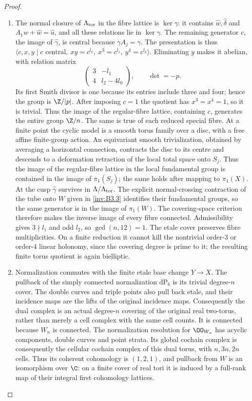 \begin{proof}
\begin{enumerate}[label={$\langle1\rangle$\arabic*.},leftmargin=*]
\item The normal closure of $\Lambda_{\rm tor}$ in the fibre lattice is
$\ker\gamma$: it contains $\hat w,\hat\delta$ and
$A_1\hat w+\hat w=\hat u$, and all these relations lie in
$\ker\gamma$. The remaining generator $c$, the image of
$\hat\gamma$, is central because $\gamma A_j=\gamma$.
The presentation is thus
$\langle c,x,y\mid c\text{ central},\ xy=c^{l_0},\
x^3=c^{l_1},\ y^4=c^{l_2}\rangle$.
Eliminating $y$ makes it abelian, with relation matrix
\[
 \begin{pmatrix}3&-l_1\\4&l_2-4l_0\end{pmatrix},
 \qquad\det=-p.
\]
Its first Smith divisor is one because its entries include three
and four; hence the group is $\Z/|p|$.
After imposing $c=1$ the quotient has $x^3=x^4=1$, so it is trivial.
Thus the image of the regular-fibre lattice, containing $c$, generates
the entire group $\Z/n$. The same is true of each reduced special
fibre. At a finite point the cyclic model is a smooth torus family
over a disc, with a free affine finite-group action. An equivariant
smooth trivialization, obtained by averaging a horizontal connection,
contracts the disc to its centre and descends to a deformation
retraction of the local total space onto $S_j$. Thus the image of
the regular-fibre lattice in the local fundamental group is contained
in the image of $\pi_1(S_j)$; the same holds after mapping to
$\pi_1(X)$. At the cusp $\hat\gamma$ survives in
$\Lambda/\Lambda_{\rm tor}$. The explicit normal-crossing contraction
of the tube onto $W$ given in \ref{inv:B3.3} identifies their fundamental groups,
so the same generator is in the image of $\pi_1(W)$.
The covering-space criterion therefore makes the inverse image of
every fibre connected. Admissibility gives $3\nmid l_1$ and odd $l_2$,
so $\gcd(n,12)=1$. The etale cover preserves fibre multiplicities.
On a finite reduction it cannot kill the nontrivial order-$3$ or
order-$4$ linear holonomy, since the covering degree is prime to it;
the resulting finite torus quotient is again bielliptic.

\item Normalization commutes with the finite etale base change $Y\to X$.
The pullback of the simply connected normalization $\mathrm{dP}_6$
is its trivial degree-$n$ cover. The double curves and triple points
also pull back etale, and their incidence maps are the lifts of the
original incidence maps. Consequently the dual complex is an actual
degree-$n$ covering of the original real two-torus, rather than merely
a cell complex with the same cell counts. It is connected because
$W_n$ is connected. The normalization resolution for $\OO_{W_n}$
has acyclic components, double curves and point strata. Its global
cochain complex is consequently the cellular cochain complex of this
dual torus, with $n,3n,2n$ cells. Thus its coherent cohomology is
$(1,2,1)$, and pullback from $W$ is an isomorphism over $\C$:
on a finite cover of real tori it is induced by a full-rank map of
their integral first cohomology lattices.


\end{enumerate}
\end{proof}
